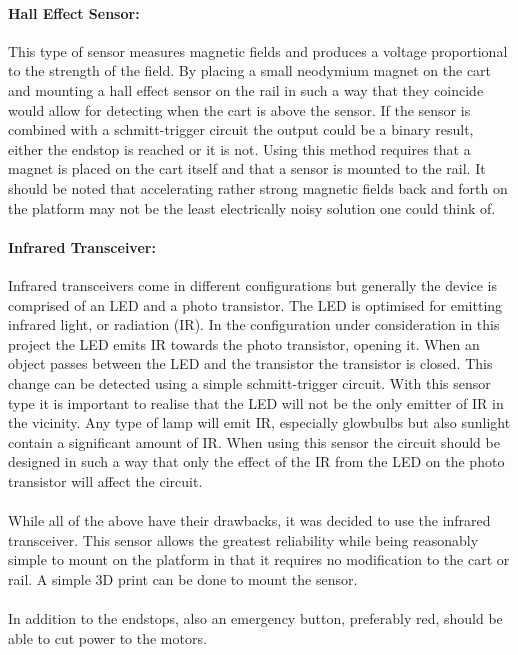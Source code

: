 \paragraph{Hall Effect Sensor:} %
\label{par:hall_effect_sensor}
This type of sensor measures magnetic fields and produces a voltage proportional to the strength of the field.
By placing a small neodymium magnet on the cart and mounting a hall effect sensor on the rail in such a way that they coincide would allow for detecting when the cart is above the sensor.
If the sensor is combined with a schmitt-trigger circuit the output could be a binary result, either the endstop is reached or it is not.
Using this method requires that a magnet is placed on the cart itself and that a sensor is mounted to the rail.
It should be noted that accelerating rather strong magnetic fields back and forth on the platform may not be the least electrically noisy solution one could think of.
\paragraph{Infrared Transceiver:} %
\label{par:infrared_transceiver}
Infrared transceivers come in different configurations but generally the device is comprised of an LED and a photo transistor.
The LED is optimised for emitting infrared light, or radiation (IR).
In the configuration under consideration in this project the LED emits IR towards the photo transistor, opening it.
When an object passes between the LED and the transistor the transistor is closed.
This change can be detected using a simple schmitt-trigger circuit. 
With this sensor type it is important to realise that the LED will not be the only emitter of IR in the vicinity.
Any type of lamp will emit IR, especially glowbulbs but also sunlight contain a significant amount of IR.
When using this sensor the circuit should be designed in such a way that only the effect of the IR from the LED on the photo transistor will affect the circuit.
\\~\\
While all of the above have their drawbacks, it was decided to use the infrared transceiver.
This sensor allows the greatest reliability while being reasonably simple to mount on the platform in that it requires no modification to the cart or rail.
A simple 3D print can be done to mount the sensor.
\\~\\
In addition to the endstops, also an emergency button, preferably red, should be able to cut power to the motors.

